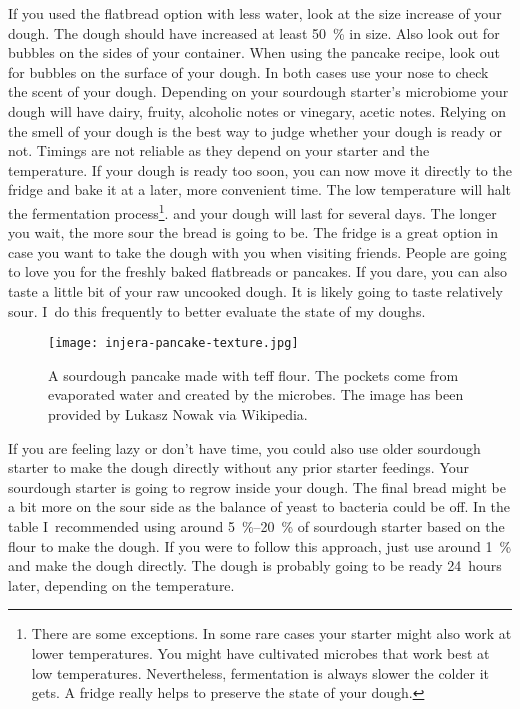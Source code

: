 If you used the flatbread option with less water, look at the size increase
of your dough. The dough should have increased at least \qty{50}{\percent} in size.
Also look out for bubbles on the sides of your container.
When using the pancake recipe, look out for bubbles on the surface of your dough.
In both cases use your nose to check the scent of your dough. Depending
on your sourdough starter's microbiome your dough will have
dairy, fruity, alcoholic notes or vinegary, acetic notes. Relying
on the smell of your dough is the best way to judge whether your
dough is ready or not. Timings are not reliable as they
depend on your starter and the temperature. If your dough
is ready too soon, you can now move it directly to the fridge and bake
it at a later, more convenient time. The low temperature will halt the fermentation
process\footnote{There are some exceptions. In some rare cases your starter
might also work at lower temperatures. You might have cultivated microbes that work best at
low temperatures. Nevertheless, fermentation
is always slower the colder it gets. A fridge really helps to preserve the state
of your dough.}.
and your dough will last for several days. The longer you wait, the more sour the
bread is going to be. The fridge is a great option in case you want to
take the dough with you when visiting friends. People are going
to love you for the freshly baked flatbreads or pancakes. If you dare,
you can also taste a little bit of your raw uncooked dough. It is likely
going to taste relatively sour. I~do this frequently to better evaluate the
state of my doughs.


\begin{figure}[htb!]
\begin{center}
  \texttt{[image: injera-pancake-texture.jpg]}
  \caption{A sourdough pancake made with teff flour. The pockets come from
  evaporated water and  created by the microbes.
  The image has been provided by Lukasz Nowak via Wikipedia.}
\end{center}
\end{figure}

If you are feeling lazy or don't have time, you could also use older sourdough starter
to make the dough directly without any prior starter feedings. Your sourdough starter
is going to regrow inside your dough. The
final bread might be a bit more on the sour side as the balance of yeast to
bacteria could be off. In the table I~recommended using around \qtyrange{5}{20}{\percent}
of sourdough starter based on the flour to make the dough. If you were to follow
this approach, just use around \qty{1}{\percent} and make the dough directly.
The dough is probably going to be ready 24~hours later, depending on the temperature.

